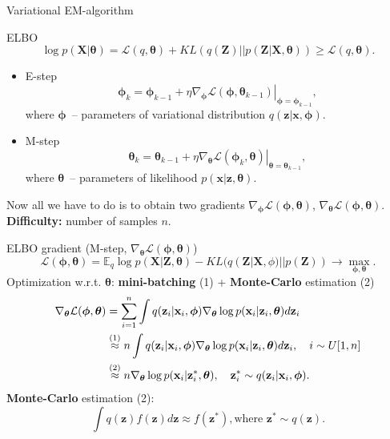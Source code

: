 \documentclass{beamer}
\newcommand{\bx}{\mathbf{x}}
\newcommand{\bz}{\mathbf{z}}
\newcommand{\bX}{\mathbf{X}}
\newcommand{\bZ}{\mathbf{Z}}
\newcommand{\bphi}{\boldsymbol{\phi}}
\newcommand{\btheta}{\boldsymbol{\theta}}
\begin{document}
\begin{frame}{Variational EM-algorithm}

	\begin{block}{ELBO}
		\vspace{-0.1cm}
		\[
		\log p(\bX| \btheta) = \mathcal{L} (q, \btheta) + KL(q(\bZ) || p(\bZ|\bX, \btheta)) \geq \mathcal{L} (q, \btheta).
		\]
	\end{block}
	\begin{itemize}
		\item E-step
		\[
		\bphi_k = \bphi_{k-1} + \left.\eta \nabla_{\bphi} \mathcal{L}(\bphi, \btheta_{k-1})\right|_{\bphi=\bphi_{k-1}},
		\]
		where $\bphi$~-- parameters of variational distribution $q(\bz | \bx, \bphi)$.
		\item M-step
		\[
		\btheta_k = \btheta_{k-1} + \left.\eta \nabla_{\btheta} \mathcal{L}(\bphi_k, \btheta)\right|_{\btheta=\btheta_{k-1}},
		\]
		where $\btheta$~-- parameters of likelihood $p(\bx | \bz, \btheta)$.
	\end{itemize}
	Now all we have to do is to obtain two gradients $\nabla_{\bphi} \mathcal{L}(\bphi, \btheta)$, $\nabla_{\btheta} \mathcal{L}(\bphi, \btheta)$.  \\
	\textbf{Difficulty:} number of samples $n$.
\end{frame}
\begin{frame}{ELBO gradient (M-step, $\nabla_{\btheta} \mathcal{L}(\bphi, \btheta)$)}
\vspace{-0.3cm}
\[
	\mathcal{L} (\bphi, \btheta)  = \mathbb{E}_{q} \log p(\bX | \bZ, \btheta) - KL (q(\bZ| \bX, \phi) || p(\bZ)) \rightarrow \max_{\bphi, \btheta}.
\]
Optimization w.r.t. $\btheta$: \textbf{mini-batching} (1) + \textbf{Monte-Carlo} estimation (2)
\begin{align*}
	\nabla_{\btheta} \mathcal{L} (\bphi, \btheta)
	&= \sum_{i=1}^n \int q(\bz_i|\bx_i, \bphi) \nabla_{\btheta}\log p(\bx_i|\bz_i, \btheta)  d \bz_i \\
	&\mathrel{\stackrel{\rm (1)}\approx} n\int q(\bz_i|\bx_i, \bphi) \nabla_{\btheta}\log p(\bx_i|\bz_i, \btheta) d \bz_i , \quad i \sim U[1, n] \\
	&\mathrel{\stackrel{\rm (2)}\approx}  n \nabla_{\btheta}\log p(\bx_i|\bz^*_i, \btheta), \quad \bz^*_i \sim q(\bz_i|\bx_i, \bphi).
\end{align*}
\textbf{Monte-Carlo} estimation (2):
\[
	\int q(\bz) f(\bz) d\bz \approx f(\bz^*), \text{where } \bz^* \sim q(\bz).
\]
\end{frame}
\end{document}
